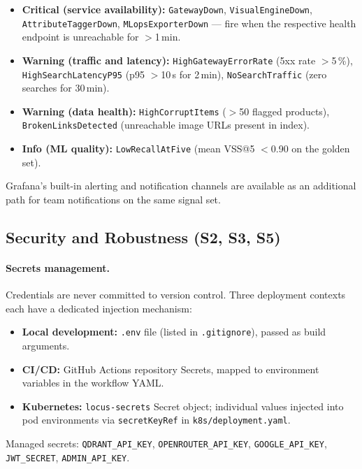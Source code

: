 \documentclass[12pt]{article}
\begin{document}
\begin{itemize}[leftmargin=*, itemsep=1pt]
    \item \textbf{Critical (service availability):} \texttt{GatewayDown}, \texttt{VisualEngineDown}, \texttt{AttributeTaggerDown}, \texttt{MLopsExporterDown} --- fire when the respective health endpoint is unreachable for $>$1\,min.
    \item \textbf{Warning (traffic and latency):} \texttt{HighGatewayErrorRate} (5xx rate $>$5\,\%), \texttt{HighSearchLatencyP95} (p95 $>$10\,s for 2\,min), \texttt{NoSearchTraffic} (zero searches for 30\,min).
    \item \textbf{Warning (data health):} \texttt{HighCorruptItems} ($>$50 flagged products), \texttt{BrokenLinksDetected} (unreachable image URLs present in index).
    \item \textbf{Info (ML quality):} \texttt{LowRecallAtFive} (mean VSS@5 $<$0.90 on the golden set).
\end{itemize}

Grafana's built-in alerting and notification channels are available as an additional path for team notifications on the same signal set.

\subsection{Security and Robustness (S2, S3, S5)}

\paragraph{Secrets management.}
Credentials are never committed to version control. Three deployment contexts each have a dedicated injection mechanism:
\begin{itemize}[leftmargin=*, itemsep=2pt]
    \item \textbf{Local development:} \texttt{.env} file (listed in \texttt{.gitignore}), passed as build arguments.
    \item \textbf{CI/CD:} GitHub Actions repository Secrets, mapped to environment variables in the workflow YAML.
    \item \textbf{Kubernetes:} \texttt{locus-secrets} Secret object; individual values injected into pod environments via \texttt{secretKeyRef} in \texttt{k8s/deployment.yaml}.
\end{itemize}
Managed secrets: \texttt{QDRANT\_API\_KEY}, \texttt{OPENROUTER\_API\_KEY}, \texttt{GOOGLE\_API\_KEY}, \texttt{JWT\_SECRET}, \texttt{ADMIN\_API\_KEY}.
\end{document}

